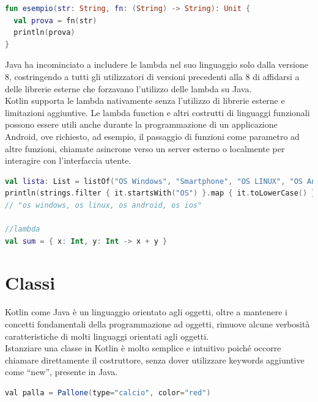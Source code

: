 \begin{lstlisting}[language=kotlin,caption={Funzioni ordine superiore}]
fun esempio(str: String, fn: (String) -> String): Unit {
  val prova = fn(str)
  println(prova)
}
\end{lstlisting}

Java ha incominciato a includere le lambda nel suo linguaggio solo dalla versione 8, costringendo a tutti gli utilizzatori di versioni precedenti alla 8 di affidarsi a delle librerie esterne che forzavano l'utilizzo delle lambda su Java. \\
Kotlin supporta le lambda nativamente senza l'utilizzo di librerie esterne e limitazioni aggiuntive. Le lambda function e altri costrutti di linguaggi funzionali possono essere utili anche durante la programmazione di un applicazione Android, ove richiesto, ad esempio, il passaggio di funzioni come parametro ad altre funzioni, chiamate asincrone verso un server esterno o localmente per interagire con l'interfaccia utente.

\begin{lstlisting}[language=kotlin,caption={Esempio Kotlin Programmazione funzionale}]
val lista: List = listOf("OS Windows", "Smartphone", "OS LINUX", "OS Android", "RAM", "OS IOS", "Scarpe")
println(strings.filter { it.startsWith("OS") }.map { it.toLowerCase() }.joinToString())
// "os windows, os linux, os android, os ios"

//lambda
val sum = { x: Int, y: Int -> x + y }
\end{lstlisting}



\section{Classi}
Kotlin come Java è un linguaggio orientato agli oggetti, oltre a mantenere i concetti fondamentali della programmazione ad oggetti, rimuove alcune verbosità caratteristiche di molti linguaggi orientati agli oggetti.\\
Istanziare una classe in Kotlin è molto semplice e intuitivo poiché occorre chiamare direttamente il costruttore, senza dover utilizzare keywords aggiuntive come ``new'', presente in Java.

\begin{lstlisting}[language=java,caption={Esempio classe in Kotlin}]
val palla = Pallone(type="calcio", color="red")
\end{lstlisting}



